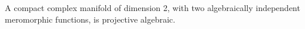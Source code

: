 A compact complex manifold of dimension 2, with two algebraically independent meromorphic functions, is projective algebraic.
